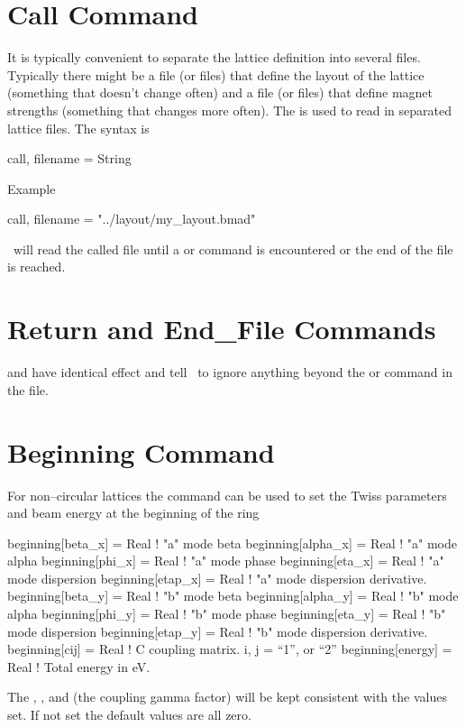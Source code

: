 \section{Call Command}

It is typically convenient to separate the lattice definition into several files.
Typically there might be a file (or files) that define the layout of the lattice
(something that doesn't change often) and a file (or files) that define magnet strengths
(something that changes more often).
The  is used to read in separated lattice files. The syntax is
\begin{example}
  call, filename = String
\end{example}
Example
\begin{example}
  call, filename = "../layout/my_layout.bmad"
\end{example}
\bmad\ will read the called file until a  or  command is encountered
or the end of the file is reached.

\section{Return and End\_File Commands}

 and  have identical effect and tell \bmad\ to ignore anything
beyond the  or  command in the file.

\section{Beginning Command}

For non--circular lattices the  command can be used to set the Twiss parameters 
and beam energy at the beginning of the ring 
\begin{example}
  beginning[beta_x]  = Real  ! "a" mode beta
  beginning[alpha_x] = Real  ! "a" mode alpha
  beginning[phi_x]   = Real  ! "a" mode phase
  beginning[eta_x]   = Real  ! "a" mode dispersion
  beginning[etap_x]  = Real  ! "a" mode dispersion derivative.
  beginning[beta_y]  = Real  ! "b" mode beta
  beginning[alpha_y] = Real  ! "b" mode alpha
  beginning[phi_y]   = Real  ! "b" mode phase
  beginning[eta_y]   = Real  ! "b" mode dispersion
  beginning[etap_y]  = Real  ! "b" mode dispersion derivative.
  beginning[cij]     = Real  ! C coupling matrix. i, j = {``1'', or ``2''} 
  beginning[energy]  = Real  ! Total energy in eV.
\end{example}
The , , and  (the coupling gamma factor) 
will be kept consistent with the values set. If not set the default values are all zero. 

